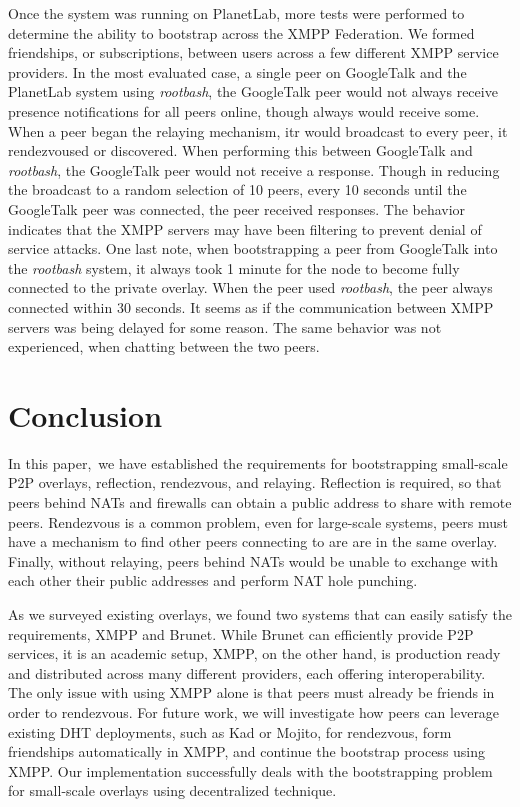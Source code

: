 \documentclass[conference]{IEEEtran}
\begin{document}
Once the system was running on PlanetLab, more tests were performed to
determine the ability to bootstrap across the XMPP Federation.  We formed
friendships, or subscriptions, between users across a few different XMPP
service providers.  In the most evaluated case, a single peer on GoogleTalk and
the PlanetLab system using \textit{rootbash}, the GoogleTalk peer would not
always receive presence notifications for all peers online, though always would
receive some.  When a peer began the relaying mechanism, itr would broadcast to
every peer, it rendezvoused or discovered.  When performing this between
GoogleTalk and \textit{rootbash}, the GoogleTalk peer would not receive a
response.  Though in reducing the broadcast to a random selection of 10 peers,
every 10 seconds until the GoogleTalk peer was connected, the peer received
responses.  The behavior indicates that the XMPP servers may have been
filtering to prevent denial of service attacks.  One last note, when
bootstrapping a peer from GoogleTalk into the \textit{rootbash} system, it
always took 1 minute for the node to become fully connected to the private
overlay.  When the peer used \textit{rootbash}, the peer always connected
within 30 seconds.  It seems as if the communication between XMPP servers was
being delayed for some reason.  The same behavior was not experienced, when
chatting between the two peers.

\section{Conclusion}
\label{conclusions}

In this paper, we have established the requirements for bootstrapping small-scale
P2P overlays, reflection, rendezvous, and relaying.  Reflection is required, so
that peers behind NATs and firewalls can obtain a public address to share with
remote peers.  Rendezvous is a common problem, even for large-scale systems,
peers must have a mechanism to find other peers connecting to are are in the
same overlay.  Finally, without relaying, peers behind NATs would be unable to
exchange with each other their public addresses and perform NAT hole punching.

As we surveyed existing overlays, we found two systems that can easily satisfy
the requirements, XMPP and Brunet.  While Brunet can efficiently provide P2P
services, it is an academic setup, XMPP, on the other hand, is production ready
and distributed across many different providers, each offering
interoperability.  The only issue with using XMPP alone is that peers must
already be friends in order to rendezvous.  For future work, we will
investigate how peers can leverage existing DHT deployments, such as Kad or
Mojito, for rendezvous, form friendships automatically in XMPP, and continue
the bootstrap process using XMPP.  Our implementation successfully deals with
the bootstrapping problem for small-scale overlays using decentralized
technique.
\end{document}
